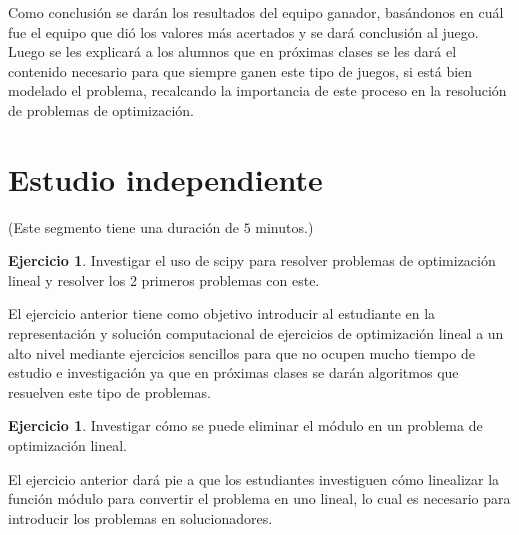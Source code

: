 \documentclass[a4paper,10pt,twocolumn]{article}
\theoremstyle{theorem}
\theoremstyle{definition}
\newtheorem{ejer}[thm]{Ejercicio}
\theoremstyle{remark}
\begin{document}
Como conclusión se darán los resultados del equipo ganador, basándonos en cuál fue el equipo que dió los valores más acertados y se dará conclusión al juego.\\

Luego se les explicará a los alumnos que en próximas clases se les dará el contenido necesario para que siempre ganen este tipo de juegos, si está bien modelado el problema, recalcando la importancia de este proceso en la resolución de problemas de optimización.

\section{Estudio independiente} \label{independ}
(Este segmento tiene una duración de $5$ minutos.)\\
 
%
%
%
\begin{ejer}
	Investigar el uso de scipy para resolver problemas de optimización lineal y resolver los 2 primeros problemas con este.
\end{ejer}
El ejercicio anterior tiene como objetivo introducir al estudiante en la representación y solución computacional de ejercicios de optimización lineal a un alto nivel mediante ejercicios sencillos para que no ocupen mucho tiempo de estudio e investigación ya que en próximas clases se darán algoritmos que resuelven este tipo de problemas.

\begin{ejer}
	Investigar cómo se puede eliminar el módulo en un problema de optimización lineal. 
\end{ejer}
El ejercicio anterior dará pie a que los estudiantes investiguen cómo linealizar la función módulo para convertir el problema en uno lineal, lo cual es necesario para introducir los problemas en solucionadores.
\end{document}
